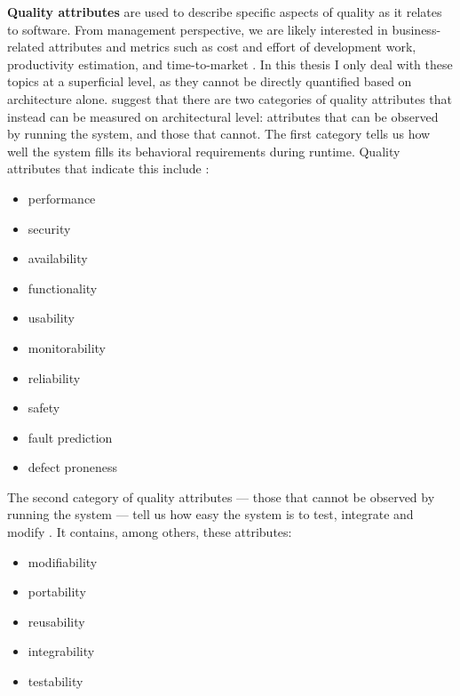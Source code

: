 \documentclass[utf8,english]{gradu3}
\begin{document}
\textbf{Quality attributes} are used to describe specific aspects of quality as
it relates to software. From management perspective, we are likely interested in
business-related attributes and metrics such as cost and effort of development
work, productivity estimation, and time-to-market
\parencites[60]{Arvanitou2017}[76]{Bass1998}. In this thesis I only deal with
these topics at a superficial level, as they cannot be directly quantified based
on architecture alone. \textcite[76]{Bass1998} suggest that there are two
categories of quality attributes that instead can be measured on architectural
level: attributes that can be observed by running the system, and those
that cannot. The first category tells us how well the system fills its
behavioral requirements during runtime. Quality attributes that indicate this
include \parencites[79-81]{Bass1998}[13]{Li2021}[60]{Arvanitou2017}:
\begin{itemize}
  \item performance
  \item security
  \item availability
  \item functionality
  \item usability
  \item monitorability
  \item reliability
  \item safety
  \item fault prediction
  \item defect proneness
\end{itemize}

The second category of quality attributes --- those that cannot be
  observed by running the system --- tell us how easy the system is to test,
integrate and modify \parencite[81]{Bass1998}. It contains, among others, these
attributes:
\begin{itemize}
  \item modifiability
  \item portability
  \item reusability
  \item integrability
  \item testability
\end{itemize}
\end{document}
